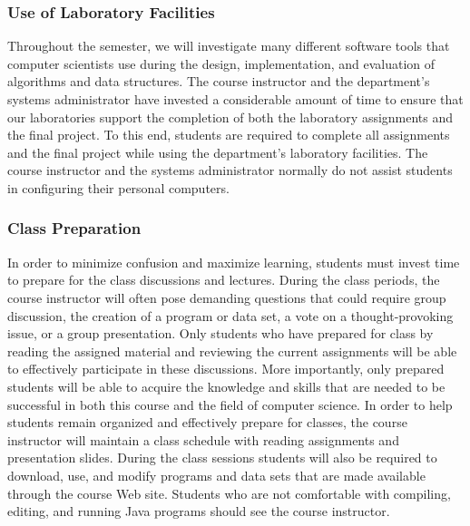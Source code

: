 \subsubsection*{Use of Laboratory Facilities}

Throughout the semester, we will investigate many different software tools that computer scientists use during the
design, implementation, and evaluation of algorithms and data structures.  The course instructor and the department's
systems administrator have invested a considerable amount of time to ensure that our laboratories support the completion
of both the laboratory assignments and the final project.  To this end, students are required to complete all
assignments and the final project while using the department's laboratory facilities. The course instructor and the
systems administrator normally do not assist students in configuring their personal computers.

\subsubsection*{Class Preparation}

% 

In order to minimize confusion and maximize learning, students must invest time to prepare for the class discussions and
lectures.  During the class periods, the course instructor will often pose demanding questions that could require group
discussion, the creation of a program or data set, a vote on a thought-provoking issue, or a group presentation.  Only
students who have prepared for class by reading the assigned material and reviewing the current assignments will be able
to effectively participate in these discussions.  More importantly, only prepared students will be able to acquire the
knowledge and skills that are needed to be successful in both this course and the field of computer science.  In order
to help students remain organized and effectively prepare for classes, the course instructor will maintain a class
schedule with reading assignments and presentation slides.   During the class sessions students will also be required to
download, use, and modify programs and data sets that are made available through the course Web site.  Students who are
not comfortable with compiling, editing, and running Java programs should see the course instructor.


